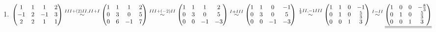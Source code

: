 \documentclass{article}
\newcommand{\uu}[1]{\underline{\underline{#1}}}
\newcommand{\eqto}[1]{\overset{#1}{\sim}}
\begin{document}
\begin{enumerate}[A =]
    \item $\begin{pmatrix}
        1&1&1&2\\-1&2&-1&3\\2&2&1&1
    \end{pmatrix}
    \eqto{III+(2)II, II+I}
    \begin{pmatrix}
        1&1&1&2\\0&3&0&5\\0&6&-1&7
    \end{pmatrix}
    \eqto{III+(-2)II}
    \begin{pmatrix}
        1&1&1&2\\0&3&0&5\\0&0&-1&-3
    \end{pmatrix}
    \eqto{I+III}
    \begin{pmatrix}
        1&1&0&-1\\
        0&3&0&5\\
        0&0&-1&-3
    \end{pmatrix} \\ \\ \\
    \eqto{\frac{1}{3}II, -1III}
    \begin{pmatrix}
        1&1&0&-1\\
        0&1&0&\frac{5}{3}\\
        0&0&1&3
    \end{pmatrix}    
    \eqto{I-II}
    \uu{\begin{pmatrix}
        1&0&0&-\frac{8}{3}\\
        0&1&0&\frac{5}{3}\\
        0&0&1&3
    \end{pmatrix}}$

\vspace{5em}


\end{enumerate}
\end{document}
